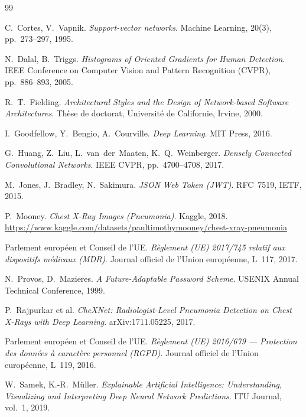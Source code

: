 \documentclass[12pt, a4paper]{report}
\begin{document}
\begin{thebibliography}{99}

C.~Cortes, V.~Vapnik.
\textit{Support-vector networks}.
Machine Learning, 20(3), pp.~273--297, 1995.

N.~Dalal, B.~Triggs.
\textit{Histograms of Oriented Gradients for Human Detection}.
IEEE Conference on Computer Vision and Pattern Recognition (CVPR),
pp.~886--893, 2005.

R.~T.~Fielding.
\textit{Architectural Styles and the Design of Network-based Software Architectures}.
Thèse de doctorat, Université de Californie, Irvine, 2000.

I.~Goodfellow, Y.~Bengio, A.~Courville.
\textit{Deep Learning}.
MIT Press, 2016.

G.~Huang, Z.~Liu, L.~van~der~Maaten, K.~Q.~Weinberger.
\textit{Densely Connected Convolutional Networks}.
IEEE CVPR, pp.~4700--4708, 2017.

M.~Jones, J.~Bradley, N.~Sakimura.
\textit{JSON Web Token (JWT)}.
RFC~7519, IETF, 2015.

P.~Mooney.
\textit{Chest X-Ray Images (Pneumonia)}.
Kaggle, 2018.
\url{https://www.kaggle.com/datasets/paultimothymooney/chest-xray-pneumonia}

Parlement européen et Conseil de l'UE.
\textit{Règlement (UE) 2017/745 relatif aux dispositifs médicaux (MDR)}.
Journal officiel de l'Union européenne, L~117, 2017.

N.~Provos, D.~Mazieres.
\textit{A Future-Adaptable Password Scheme}.
USENIX Annual Technical Conference, 1999.

P.~Rajpurkar et al.
\textit{CheXNet: Radiologist-Level Pneumonia Detection on Chest X-Rays
with Deep Learning}.
arXiv:1711.05225, 2017.

Parlement européen et Conseil de l'UE.
\textit{Règlement (UE) 2016/679 --- Protection des données à caractère personnel (RGPD)}.
Journal officiel de l'Union européenne, L~119, 2016.

W.~Samek, K.-R.~Müller.
\textit{Explainable Artificial Intelligence: Understanding, Visualizing
and Interpreting Deep Neural Network Predictions}.
ITU Journal, vol.~1, 2019.


\end{thebibliography}
\end{document}
